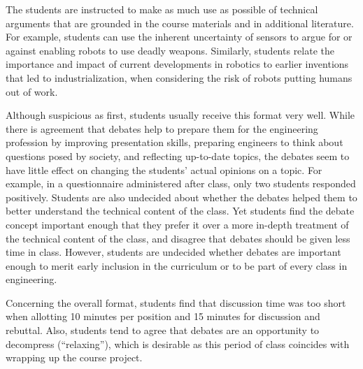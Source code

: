 \documentclass[paper=6.14in:9.21in,pagesize=pdftex,11pt,twoside,openright]{scrbook}
\begin{document}
The students are instructed to make as much use as possible of technical arguments that are grounded in the course materials and in additional literature. For example, students can use the inherent uncertainty of sensors to argue for or against enabling robots to use deadly weapons. Similarly, students relate the importance and impact of current developments in robotics to earlier inventions that led to industrialization, when considering the risk of robots putting humans out of work.

Although suspicious as first, students usually receive this format very well.  While there is agreement that debates help to prepare them for the engineering profession by improving presentation skills, preparing engineers to think about questions posed by society, and reflecting up-to-date topics, the debates seem to have little effect on changing the students' actual opinions on a topic. For example, in a questionnaire administered after class, only two students responded positively. Students are also undecided about whether the debates helped them to better understand the technical content of the class. Yet students find the debate concept important enough that they prefer it over a more in-depth treatment of the technical content of the class, and disagree that debates should be given less time in class. However, students are undecided whether debates are important enough to merit early inclusion in the curriculum or to be part of every class in engineering.

Concerning the overall format, students find that discussion time was too short when allotting 10 minutes per position and 15 minutes for discussion and rebuttal. Also, students tend to agree that debates are an opportunity to decompress (``relaxing''), which is desirable as this period of class coincides with wrapping up the course project.




\printindex
\end{document}
